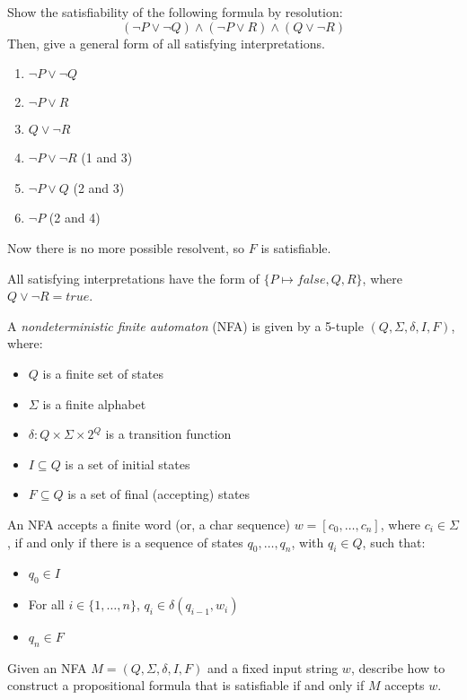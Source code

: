 \documentclass[11pt,a4paper]{article}
\begin{document}
\subproblem Show the satisfiability of the following formula by resolution:
$$(\lnot P \lor \lnot Q) \land (\lnot P \lor R) \land (Q \lor \lnot R)$$
Then, give a general form of all satisfying interpretations.

\begin{solution}
	\begin{enumerate}
		\item $\lnot P \lor \lnot Q$
		\item $\lnot P \lor R$
		\item $Q \lor \lnot R$
		\item $\lnot P \lor \lnot R$ (1 and 3)
		\item $\lnot P \lor Q$ (2 and 3)
		\item $\lnot P$ (2 and 4)
	\end{enumerate}

	Now there is no more possible resolvent, so $F$ is satisfiable.
	
	All satisfying interpretations have the form of $\{P \mapsto false, Q, R\}$, where $Q \lor \lnot R = true$.
\end{solution}

\newpage
{}

A \emph{nondeterministic finite automaton} (NFA) is given by a 5-tuple $(Q, \Sigma, \delta, I, F)$, where:
\begin{itemize}
    \item $Q$ is a finite set of states
    \item $\Sigma$ is a finite alphabet
    \item $\delta: Q \times \Sigma \times 2^Q$ is a transition function
    \item $I \subseteq Q$ is a set of initial states
    \item $F \subseteq Q$ is a set of final (accepting) states
\end{itemize}

An NFA accepts a finite word (or, a char sequence) $w = [c_0, \ldots, c_n]$, where $c_i \in \Sigma$,
if and only if there is a sequence of states $q_0, \ldots, q_n$, with $q_i \in Q$, such that:
\begin{itemize}
    \item $q_0 \in I$
    \item For all $i \in \{1, \ldots, n\}$, $q_i \in \delta(q_{i-1}, w_i)$
    \item $q_n \in F$
\end{itemize}

\subproblem Given an NFA $M=(Q, \Sigma, \delta, I, F)$ and a fixed input string $w$,
describe how to construct a propositional formula that is satisfiable if and only if $M$ accepts $w$.
\end{document}
